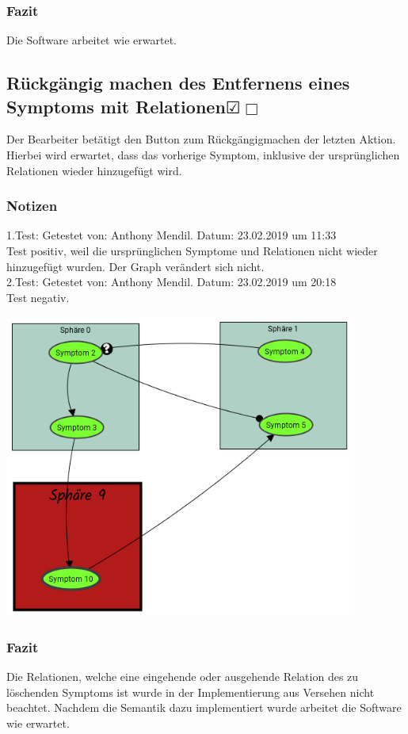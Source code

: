 \documentclass[enabledeprecatedfontcommands]{scrartcl}
\newcommand{\subsectiont}[2]{\subsection[#1]{#1{\normalsize\normalfont #2}}}
\newcommand{\leer}{$\Box$}
\newcommand{\ok}{$\CheckedBox$}
\begin{document}
\subsubsection{Fazit}
Die Software arbeitet wie erwartet. 

\subsectiont{Rückgängig machen des Entfernens eines \\Symptoms mit Relationen}{\dotfill\XBox\ok\leer}
Der Bearbeiter betätigt den Button zum Rückgängigmachen der letzten Aktion. Hierbei wird erwartet, dass das vorherige Symptom, inklusive der ursprünglichen Relationen wieder hinzugefügt wird. 
\subsubsection{Notizen}
1.Test: Getestet von: Anthony Mendil. Datum: 23.02.2019 um 11:33 \\
Test positiv, weil die ursprünglichen Symptome und Relationen nicht wieder hinzugefügt wurden. Der Graph verändert sich nicht. \\
2.Test: Getestet von: Anthony Mendil. Datum: 23.02.2019 um 20:18 \\
Test negativ.
\begin{center}
\includegraphics[height=10cm]{2_21.PNG}
\end{center}
\subsubsection{Fazit}
Die Relationen, welche eine eingehende oder ausgehende Relation des zu löschenden Symptoms ist wurde in der Implementierung aus Versehen nicht beachtet. Nachdem die Semantik dazu implementiert wurde arbeitet die Software wie erwartet. 
\end{document}
